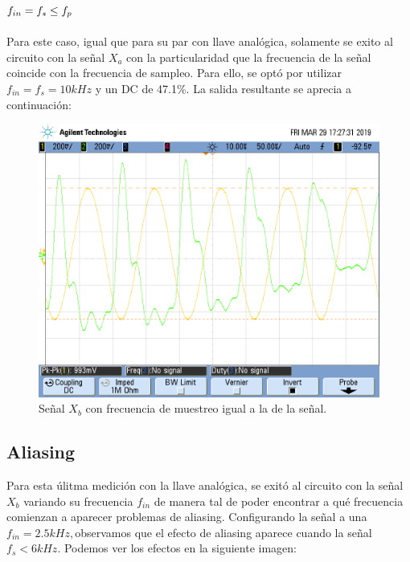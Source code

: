 \documentclass[../../ASSD_TP1_G7.tex]{subfiles}
\begin{document}
\subsection{$f_{in}=f_{s}\protect\leq f_{p}$}

Para este caso, igual que para su par con llave analógica, solamente
se exito al circuito con la señal $X_{a}$ con la particularidad que
la frecuencia de la señal coincide con la frecuencia de sampleo. Para
ello, se optó por utilizar $f_{in}=f_{s}=10kHz$ y un DC de 47.1\%.
La salida resultante se aprecia a continuación:

\begin{figure}[H]

\begin{centering}
\includegraphics[scale=0.3]{Imagenes/yh_pt6c_sin2}\caption{Señal $X_{b}$ con frecuencia de muestreo igual a la de la señal.}
\par\end{centering}
\end{figure}


\subsection{Aliasing}

Para esta úlitma medición con la llave analógica, se exitó al circuito
con la señal $X_{b}$ variando su frecuencia $f_{in}$ de manera tal
de poder encontrar a qué frecuencia comienzan a aparecer problemas
de aliasing. Configurando la señal a una $f_{in}=2.5kHz,$observamos
que el efecto de aliasing aparece cuando la señal $f_{s}<6kHz$. Podemos
ver los efectos en la siguiente imagen:
\end{document}
